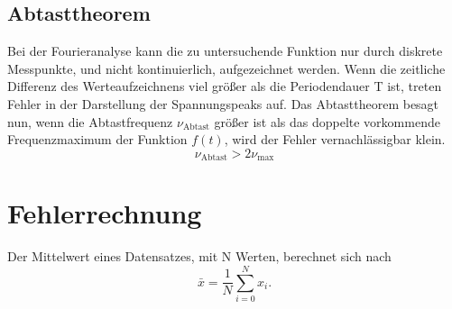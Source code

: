 \subsection{Abtasttheorem}
Bei der Fourieranalyse kann die zu untersuchende Funktion nur durch diskrete
Messpunkte, und nicht kontinuierlich, aufgezeichnet werden.
Wenn die zeitliche Differenz des Werteaufzeichnens viel größer als die
Periodendauer T ist, treten Fehler in der Darstellung der Spannungspeaks auf.
Das Abtasttheorem besagt nun, wenn die Abtastfrequenz $ν_{\text{Abtast}}$
größer ist als das doppelte vorkommende Frequenzmaximum der Funktion $f(t)$,
wird der Fehler vernachlässigbar klein.
\begin{equation}
  ν_{\text{Abtast}} > 2ν_{\text{max}}
  \label{eqn:abtast}
\end{equation}
\section{Fehlerrechnung}
Der Mittelwert eines Datensatzes, mit N Werten, berechnet sich nach
\begin{equation}
  \bar{x} = \frac{1}{N} \sum_{i=0}^{N} x_i.
  \label{eqn:mittelwert}
\end{equation}
\newpage
